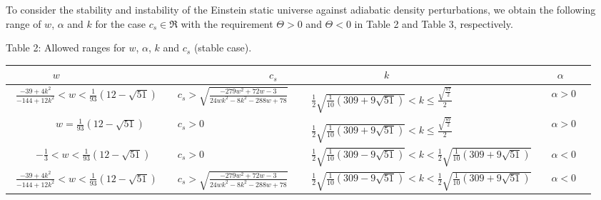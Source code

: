 \documentclass[showpacs,amsmath,nofootinbib,amssymb,epsfig]{revtex4}
\begin{document}
To consider the stability and instability of the Einstein static universe against adiabatic density perturbations, we obtain the following range of $w$, $\alpha$ and $k$  for the case $c_s\in\Re$ with the requirement $\Theta>0$ and $\Theta<0$ in Table 2 and Table 3, respectively.
\vspace{5mm}
\begin{center}
{\scriptsize{ Table 2: }}\hspace{-2mm} {\scriptsize Allowed ranges for $w$, $\alpha$, $k$ and $c_s$ (stable case).}\\
    \begin{tabular}{|l| l |l |l|  p{800mm} }
    \hline
   {\footnotesize$~~~~~~~~~~~~~~~~~~~w$ }& ~~{\footnotesize~~~~~~~~~~~~~~~ $c_s$ }&~~ {\footnotesize$~~~~~~~~~~~~~~~~~~~~~~~~~~~~~~~~k$ }& ~~{\footnotesize$~~\alpha$ } \\ \hline
{\footnotesize ~$\frac{-39+4k^{2}}{-144+12k^{2}}<w<\frac{1}{93}(12-\sqrt{51})  $} & ~~{\footnotesize $c_s>\sqrt{\frac{-279 w^2+72 w-3}{24 w k^2-8 k^2-288 w+78}}$}&~ {\footnotesize ~$\frac{1}{2} \sqrt{\frac{1}{10} \left(309+9 \sqrt{51}\right)}<k\leq \frac{\sqrt{\frac{87}{2}}}{2}$}& ~~{\footnotesize$\alpha>0$ } \\\hline
 {\footnotesize ~~~~~~~~~$w=\frac{1}{93}(12-\sqrt{51})  $} & ~~{\footnotesize $c_s>0$}&~ {\footnotesize ~$\frac{1}{2} \sqrt{\frac{1}{10} \left(309+9 \sqrt{51}\right)}<k\leq \frac{\sqrt{\frac{87}{2}}}{2}$}& ~~{\footnotesize$\alpha>0$ }
\\ \hline
{\footnotesize ~~~~~$-\frac{1}{3}<w<\frac{1}{93}(12-\sqrt{51})  $} & ~~{\footnotesize $c_s>0$}&~ {\footnotesize ~$\frac{1}{2} \sqrt{\frac{1}{10} \left(309-9 \sqrt{51}\right)}<k<\frac{1}{2} \sqrt{\frac{1}{10} \left(309+9 \sqrt{51}\right)}$}& ~~{\footnotesize$\alpha<0$ } \\\hline
 {\footnotesize ~$\frac{-39+4k^{2}}{-144+12k^{2}}<w<\frac{1}{93}(12-\sqrt{51})   $} & ~~{\footnotesize $c_s>\sqrt{\frac{-279 w^2+72 w-3}{24 w k^2-8 k^2-288 w+78}}$}&~ {\footnotesize ~$\frac{1}{2} \sqrt{\frac{1}{10} \left(309-9 \sqrt{51}\right)}<k<\frac{1}{2} \sqrt{\frac{1}{10} \left(309+9 \sqrt{51}\right)}$}& ~~{\footnotesize$\alpha<0$ }
\\ \hline
    \end{tabular}
\end{center}
\vspace{2mm}
\end{document}
